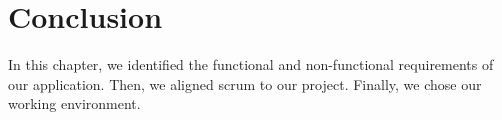 \section*{Conclusion}

In this chapter, we identified the functional and non-functional requirements of our application. Then, we aligned scrum to our project. Finally, we chose our working environment.